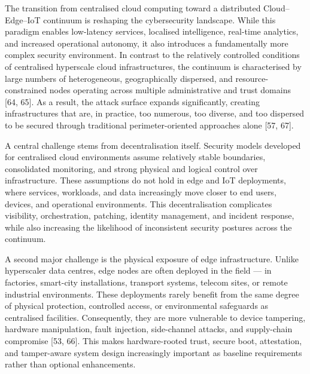 \documentclass{ieeeaccess}
\begin{document}
The transition from centralised cloud computing toward a distributed
Cloud--Edge--IoT continuum is reshaping the cybersecurity landscape.
While this paradigm enables low-latency services, localised
intelligence, real-time analytics, and increased operational autonomy,
it also introduces a fundamentally more complex security environment. In
contrast to the relatively controlled conditions of centralised
hyperscale cloud infrastructures, the continuum is characterised by
large numbers of heterogeneous, geographically dispersed, and
resource-constrained nodes operating across multiple administrative and
trust domains {[}64, 65{]}. As a result, the attack surface expands
significantly, creating infrastructures that are, in practice, too
numerous, too diverse, and too dispersed to be secured through
traditional perimeter-oriented approaches alone {[}57, 67{]}.

A central challenge stems from decentralisation itself. Security models
developed for centralised cloud environments assume relatively stable
boundaries, consolidated monitoring, and strong physical and logical
control over infrastructure. These assumptions do not hold in edge and
IoT deployments, where services, workloads, and data increasingly move
closer to end users, devices, and operational environments. This
decentralisation complicates visibility, orchestration, patching,
identity management, and incident response, while also increasing the
likelihood of inconsistent security postures across the continuum.

A second major challenge is the physical exposure of edge
infrastructure. Unlike hyperscaler data centres, edge nodes are often
deployed in the field --- in factories, smart-city installations,
transport systems, telecom sites, or remote industrial environments.
These deployments rarely benefit from the same degree of physical
protection, controlled access, or environmental safeguards as
centralised facilities. Consequently, they are more vulnerable to device
tampering, hardware manipulation, fault injection, side-channel attacks,
and supply-chain compromise {[}53, 66{]}. This makes hardware-rooted
trust, secure boot, attestation, and tamper-aware system design
increasingly important as baseline requirements rather than optional
enhancements.
\end{document}
